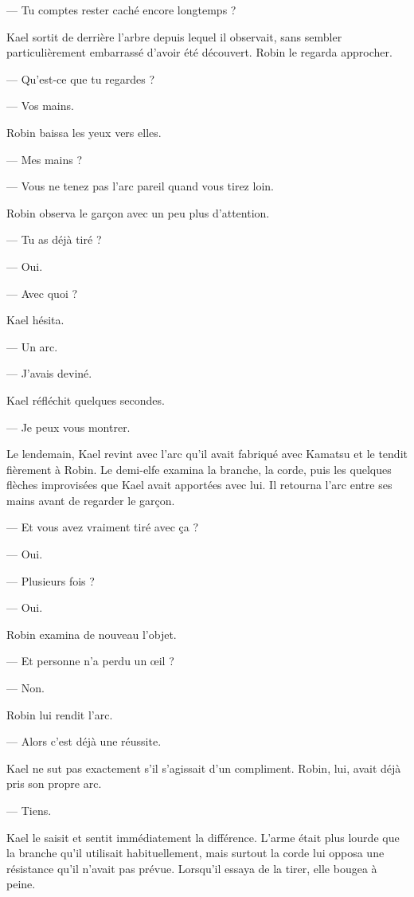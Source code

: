 — Tu comptes rester caché encore longtemps ?

Kael sortit de derrière l'arbre depuis lequel il observait, sans sembler
particulièrement embarrassé d'avoir été découvert. Robin le regarda approcher.

— Qu'est-ce que tu regardes ?

— Vos mains.

Robin baissa les yeux vers elles.

— Mes mains ?

— Vous ne tenez pas l'arc pareil quand vous tirez loin.

Robin observa le garçon avec un peu plus d'attention.

— Tu as déjà tiré ?

— Oui.

— Avec quoi ?

Kael hésita.

— Un arc.

— J'avais deviné.

Kael réfléchit quelques secondes.

— Je peux vous montrer.

\scenebreak

Le lendemain, Kael revint avec l'arc qu'il avait fabriqué avec Kamatsu et le
tendit fièrement à Robin. Le demi-elfe examina la branche, la corde, puis les
quelques flèches improvisées que Kael avait apportées avec lui. Il retourna
l'arc entre ses mains avant de regarder le garçon.

— Et vous avez vraiment tiré avec ça ?

— Oui.

— Plusieurs fois ?

— Oui.

Robin examina de nouveau l'objet.

— Et personne n'a perdu un œil ?

— Non.

Robin lui rendit l'arc.

— Alors c'est déjà une réussite.

Kael ne sut pas exactement s'il s'agissait d'un compliment. Robin, lui, avait
déjà pris son propre arc.

— Tiens.

Kael le saisit et sentit immédiatement la différence. L'arme était plus lourde
que la branche qu'il utilisait habituellement, mais surtout la corde lui opposa
une résistance qu'il n'avait pas prévue. Lorsqu'il essaya de la tirer, elle
bougea à peine.

